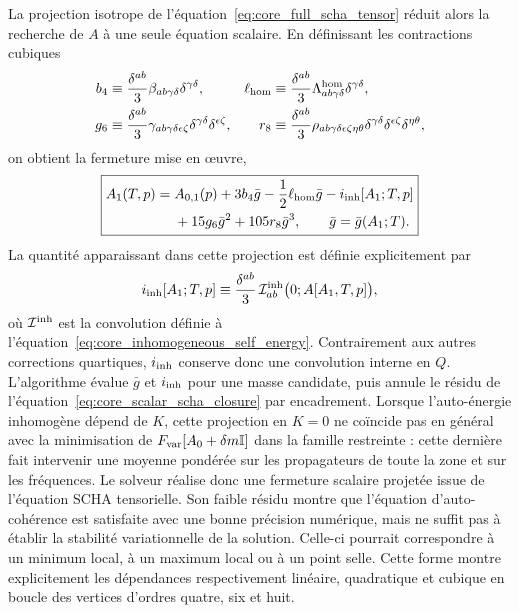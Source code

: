 La projection isotrope de l'équation~\eqref{eq:core_full_scha_tensor} réduit alors
la recherche de $A$ à une seule équation scalaire. En définissant les
contractions cubiques
\begin{equation}
\begin{aligned}
b_4&\equiv\frac{\delta^{ab}}{3}
\beta_{ab\gamma\delta}\delta^{\gamma\delta},
&\ell_{\rm hom}&\equiv\frac{\delta^{ab}}{3}
\Lambda^{\rm hom}_{ab\gamma\delta}\delta^{\gamma\delta},\\
g_6&\equiv\frac{\delta^{ab}}{3}
\gamma_{ab\gamma\delta\epsilon\zeta}
\delta^{\gamma\delta}\delta^{\epsilon\zeta},
&r_8&\equiv\frac{\delta^{ab}}{3}
\rho_{ab\gamma\delta\epsilon\zeta\eta\theta}
\delta^{\gamma\delta}\delta^{\epsilon\zeta}\delta^{\eta\theta},
\end{aligned}
\label{eq:core_cubic_vertex_projections}
\end{equation}
on obtient la fermeture mise en œuvre,
\begin{equation}
\boxed{
\begin{aligned}
A_1(T,p)={}&A_{0,1}(p)+3b_4\bar g
-\frac12\ell_{\rm hom}\bar g
-i_{\rm inh}[A_1;T,p]\\
&+15g_6\bar g^2+105r_8\bar g^3,
\qquad \bar g=\bar g(A_1;T).
\end{aligned}}
\label{eq:core_scalar_scha_closure}
\end{equation}
La quantité apparaissant dans cette projection est définie explicitement par
\begin{equation}
i_{\rm inh}[A_1;T,p]
\equiv\frac{\delta^{ab}}{3}\,
\mathcal I^{\rm inh}_{ab}\bigl(0;A[A_1,T,p]\bigr),
\label{eq:core_scalar_inhomogeneous_projection}
\end{equation}
où $\mathcal I^{\rm inh}$ est la convolution définie à
l'équation~\eqref{eq:core_inhomogeneous_self_energy}. Contrairement aux autres
corrections quartiques, $i_{\rm inh}$ conserve donc une convolution interne en
$Q$. L'algorithme évalue $\bar g$ et $i_{\rm inh}$ pour une masse candidate,
puis annule le résidu de l'équation~\eqref{eq:core_scalar_scha_closure} par
encadrement. Lorsque l'auto-énergie inhomogène dépend de $K$, cette
projection en $K=0$ ne coïncide pas en général avec la minimisation de
$F_{\rm var}[A_0+\delta m\mathbb I]$ dans la famille restreinte : cette
dernière fait intervenir une moyenne pondérée sur les propagateurs de toute
la zone et sur les fréquences. Le solveur réalise donc une fermeture scalaire
projetée issue de l'équation SCHA tensorielle. Son faible résidu montre que
l'équation d'auto-cohérence est satisfaite avec une bonne précision numérique,
mais ne suffit pas à établir la stabilité variationnelle de la solution. Celle-ci
pourrait correspondre à un minimum local, à un maximum local ou à un point selle.
Cette forme montre explicitement les dépendances respectivement
linéaire, quadratique et cubique en boucle des vertices d'ordres quatre, six et
huit.

